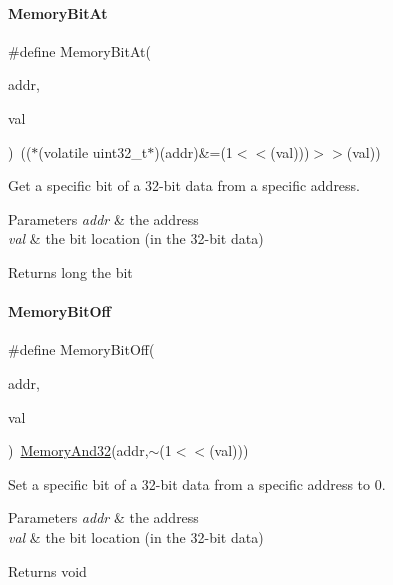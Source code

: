 \paragraph{\texorpdfstring{Memory\+Bit\+At}{MemoryBitAt}}
{\footnotesize\ttfamily \#define Memory\+Bit\+At(\begin{DoxyParamCaption}\item[{}]{addr,  }\item[{}]{val }\end{DoxyParamCaption})~(($\ast$(volatile uint32\+\_\+t$\ast$)(addr)\&=(1$<$$<$(val)))$>$$>$(val))}



Get a specific bit of a 32-\/bit data from a specific address. 


\begin{DoxyParams}{Parameters}
{\em addr} & the address \\
\hline
{\em val} & the bit location (in the 32-\/bit data) \\
\hline
\end{DoxyParams}
\begin{DoxyReturn}{Returns}
long the bit 
\end{DoxyReturn}
\mbox{\label{a00020_a04c34919a950117ae7da2dc5a235622b}} 
\paragraph{\texorpdfstring{Memory\+Bit\+Off}{MemoryBitOff}}
{\footnotesize\ttfamily \#define Memory\+Bit\+Off(\begin{DoxyParamCaption}\item[{}]{addr,  }\item[{}]{val }\end{DoxyParamCaption})~\mbox{\hyperlink{a00020_ad87cedffcaadc51db22594fce55173d4}{Memory\+And32}}(addr,$\sim$(1$<$$<$(val)))}



Set a specific bit of a 32-\/bit data from a specific address to 0. 


\begin{DoxyParams}{Parameters}
{\em addr} & the address \\
\hline
{\em val} & the bit location (in the 32-\/bit data) \\
\hline
\end{DoxyParams}
\begin{DoxyReturn}{Returns}
void 
\end{DoxyReturn}
\mbox{\label{a00020_a99a602346038b54068758ef00c42d1b6}} 

